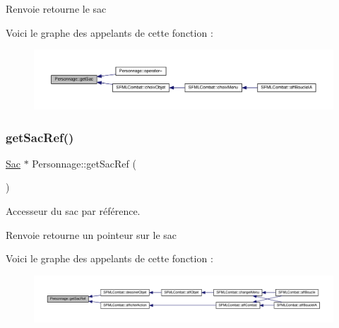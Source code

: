 \begin{DoxyReturn}{Renvoie}
retourne le sac 
\end{DoxyReturn}
Voici le graphe des appelants de cette fonction \+:\nopagebreak
\begin{figure}[H]
\begin{center}
\leavevmode
\includegraphics[width=350pt]{class_personnage_aa6dd3ce808644f01d0cdb891f67e896c_icgraph}
\end{center}
\end{figure}
\mbox{\label{class_personnage_acb7d9ff9b6b6753b8c93fae58f428db1}} 
\subsubsection{\texorpdfstring{get\+Sac\+Ref()}{getSacRef()}}
{\footnotesize\ttfamily \hyperlink{class_sac}{Sac} $\ast$ Personnage\+::get\+Sac\+Ref (\begin{DoxyParamCaption}{ }\end{DoxyParamCaption})}



Accesseur du sac par référence. 

\begin{DoxyReturn}{Renvoie}
retourne un pointeur sur le sac 
\end{DoxyReturn}
Voici le graphe des appelants de cette fonction \+:\nopagebreak
\begin{figure}[H]
\begin{center}
\leavevmode
\includegraphics[width=350pt]{class_personnage_acb7d9ff9b6b6753b8c93fae58f428db1_icgraph}
\end{center}
\end{figure}
\mbox{\label{class_personnage_a6727627eb37382d3d8f12514551df9bd}} 
